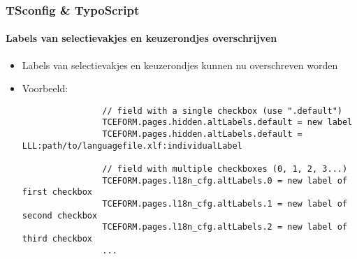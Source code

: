 
\begin{frame}[fragile]
	\frametitle{TSconfig \& TypoScript}
	\framesubtitle{Labels van selectievakjes en keuzerondjes overschrijven}

	\lstset{basicstyle=\tiny\ttfamily}

	\begin{itemize}

		\item Labels van selectievakjes en keuzerondjes kunnen nu overschreven worden
		\item Voorbeeld:

			\begin{lstlisting}
				// field with a single checkbox (use ".default")
				TCEFORM.pages.hidden.altLabels.default = new label
				TCEFORM.pages.hidden.altLabels.default = LLL:path/to/languagefile.xlf:individualLabel

				// field with multiple checkboxes (0, 1, 2, 3...)
				TCEFORM.pages.l18n_cfg.altLabels.0 = new label of first checkbox
				TCEFORM.pages.l18n_cfg.altLabels.1 = new label of second checkbox
				TCEFORM.pages.l18n_cfg.altLabels.2 = new label of third checkbox
				...
			\end{lstlisting}

	\end{itemize}

\end{frame}


